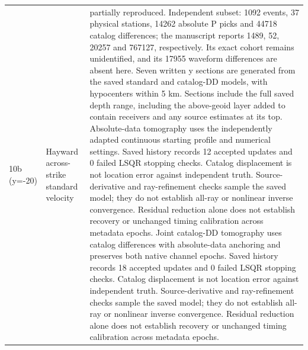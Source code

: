 \begin{longtable}{>{\raggedright\arraybackslash}p{}>{\raggedright\arraybackslash}p{}>{\raggedright\arraybackslash}p{}}
10b (y=-20) & Hayward across-strike standard velocity & partially reproduced. Independent subset: 1092 events, 37 physical stations, 14262 absolute P picks and 44718 catalog differences; the manuscript reports 1489, 52, 20257 and 767127, respectively. Its exact cohort remains unidentified, and its 17955 waveform differences are absent here. Seven written y sections are generated from the saved standard and catalog-DD models, with hypocenters within 5 km. Sections include the full saved depth range, including the above-geoid layer added to contain receivers and any source estimates at its top. Absolute-data tomography uses the independently adapted continuous starting profile and numerical settings. Saved history records 12 accepted updates and 0 failed LSQR stopping checks. Catalog displacement is not location error against independent truth. Source-derivative and ray-refinement checks sample the saved model; they do not establish all-ray or nonlinear inverse convergence. Residual reduction alone does not establish recovery or unchanged timing calibration across metadata epochs. Joint catalog-DD tomography uses catalog differences with absolute-data anchoring and preserves both native channel epochs. Saved history records 18 accepted updates and 0 failed LSQR stopping checks. Catalog displacement is not location error against independent truth. Source-derivative and ray-refinement checks sample the saved model; they do not establish all-ray or nonlinear inverse convergence. Residual reduction alone does not establish recovery or unchanged timing calibration across metadata epochs.\\

\end{longtable}
